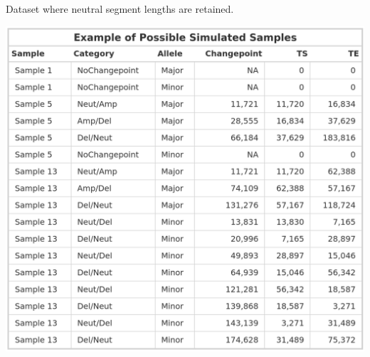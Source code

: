 \begin{table}[!h]
\begin{subtable}[t]{.49\textwidth}
      \centering
        \caption{Dataset where neutral segment lengths are retained.}
        \includegraphics[width = 1\textwidth]{../tables/Chapter_5/Indv_Simulated_Example_Neut.png}
    \end{subtable} 
    \label{tab:Model_Example}
\end{table}

\vspace{1cm}

